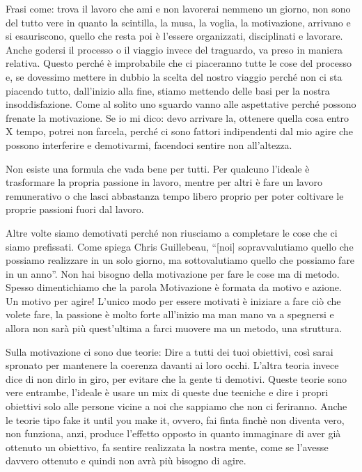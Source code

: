 \documentclass[12pt]{book} %
\begin{document}
\begin{mdframed}[linewidth=1pt]
Frasi come: trova il lavoro che ami e non lavorerai nemmeno un giorno, non sono del tutto vere in quanto la scintilla,
la musa, la voglia, la motivazione, arrivano e si esauriscono, quello che resta poi è l'essere organizzati,
disciplinati e lavorare. Anche godersi il processo o il viaggio invece del traguardo, va preso in maniera relativa.
Questo perché è improbabile che ci piaceranno tutte le cose del processo e, se dovessimo mettere in dubbio la scelta
del nostro viaggio perché non ci sta piacendo tutto, dall'inizio alla fine, stiamo mettendo delle
basi per la nostra insoddisfazione. Come al solito uno sguardo vanno alle aspettative perché possono frenate la
motivazione. Se io mi dico: devo arrivare la, ottenere quella cosa entro X tempo, potrei non farcela, perché ci sono
fattori indipendenti dal mio agire che possono interferire e demotivarmi, facendoci sentire non all'altezza.

Non esiste una formula che vada bene per tutti. Per qualcuno l'ideale è trasformare la propria
passione in lavoro, mentre per altri è fare un lavoro remunerativo o che lasci abbastanza tempo libero proprio per
poter coltivare le proprie passioni fuori dal lavoro.

Altre volte siamo demotivati perché non riusciamo a completare le cose che ci siamo prefissati. Come spiega Chris
Guillebeau, “[noi] sopravvalutiamo quello che possiamo realizzare in un solo giorno, ma sottovalutiamo quello che
possiamo fare in un anno”. Non hai bisogno della motivazione per fare le cose ma di metodo. Spesso dimentichiamo che la
parola Motivazione è formata da motivo e azione. Un motivo per agire! L'unico modo per essere motivati è iniziare a
fare ciò che volete fare, la passione è molto forte all'inizio ma man mano va a spegnersi e allora
non sarà più quest'ultima a farci muovere ma un metodo, una struttura.

Sulla motivazione ci sono due teorie: 
Dire a tutti dei tuoi obiettivi, così sarai spronato per mantenere la coerenza davanti ai loro occhi.
L'altra teoria invece dice di non dirlo in giro, per evitare che la gente ti demotivi. Queste teorie sono vere entrambe, l'ideale è usare un mix di queste due tecniche e dire i propri obiettivi solo alle persone vicine a noi che sappiamo che non ci feriranno.
Anche le teorie tipo fake it until you make it, ovvero, fai finta finchè non diventa vero, non funziona, anzi, produce l'effetto opposto in quanto immaginare di aver già ottenuto un obiettivo, fa sentire realizzata la nostra mente, come se l'avesse davvero ottenuto e quindi non avrà più bisogno di agire.


\end{mdframed}
\end{document}
